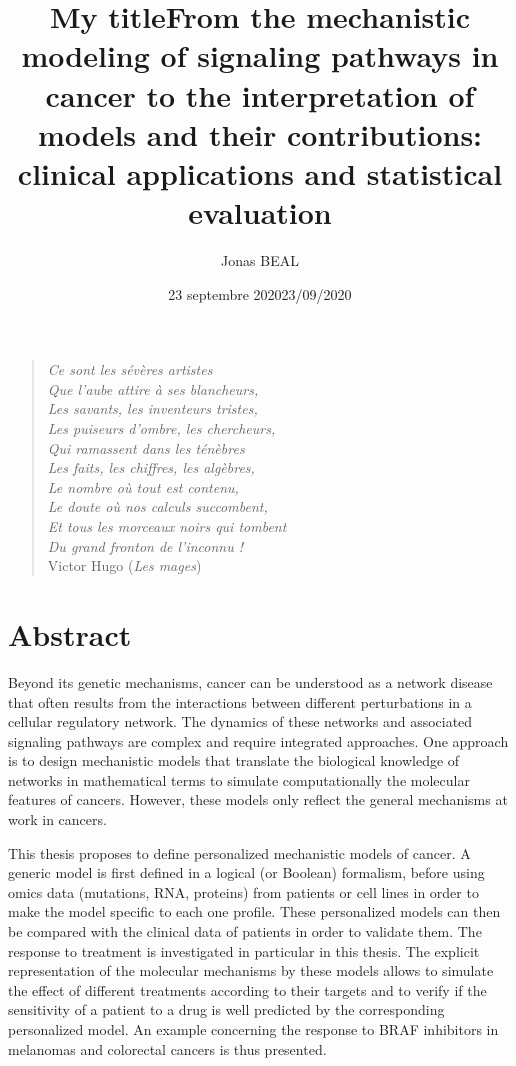 \documentclass[a4paper,12pt,twoside,onecolumn,openright,final,oldfontcommands]{memoir}
\title{My title}
\author{Jonas BEAL}
\institute{l'Institut Curie}
\institute{l'Institut Curie}
\date{23 septembre 2020}
\title{From the mechanistic modeling of signaling pathways in cancer to the
interpretation of models and their contributions: clinical applications
and statistical evaluation}
\date{23/09/2020}
\newcommand{\initial}[1]{
	\lettrine[lines=3,lhang=0.33,nindent=0em]{
		\color{gray}
     		{\textsc{#1}}}{}}
\begin{document}
\maketitle

\vspace*{\fill}

\begin{center}
\begin{quote}

\emph{Ce sont les sévères artistes}\\
\emph{Que l’aube attire à ses blancheurs,}\\
\emph{Les savants, les inventeurs tristes,}\\
\emph{Les puiseurs d’ombre, les chercheurs,}\\
\emph{Qui ramassent dans les ténèbres}\\
\emph{Les faits, les chiffres, les algèbres,}\\
\emph{Le nombre où tout est contenu,}\\
\emph{Le doute où nos calculs succombent,}\\
\emph{Et tous les morceaux noirs qui tombent}\\
\emph{Du grand fronton de l’inconnu !}\\
Victor Hugo (\emph{Les mages})

\end{quote}
\end{center}

\vfill

\chapter*{Abstract}

\initial{B}eyond its genetic mechanisms, cancer can be understood as a
network disease that often results from the interactions between
different perturbations in a cellular regulatory network. The dynamics
of these networks and associated signaling pathways are complex and
require integrated approaches. One approach is to design mechanistic
models that translate the biological knowledge of networks in
mathematical terms to simulate computationally the molecular features of
cancers. However, these models only reflect the general mechanisms at
work in cancers.

This thesis proposes to define personalized mechanistic models of
cancer. A generic model is first defined in a logical (or Boolean)
formalism, before using omics data (mutations, RNA, proteins) from
patients or cell lines in order to make the model specific to each one
profile. These personalized models can then be compared with the
clinical data of patients in order to validate them. The response to
treatment is investigated in particular in this thesis. The explicit
representation of the molecular mechanisms by these models allows to
simulate the effect of different treatments according to their targets
and to verify if the sensitivity of a patient to a drug is well
predicted by the corresponding personalized model. An example concerning
the response to BRAF inhibitors in melanomas and colorectal cancers is
thus presented.
\end{document}
